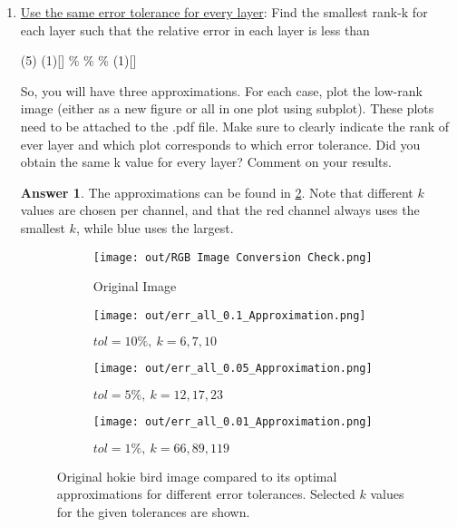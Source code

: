 \documentclass{article}
\theoremstyle{definition}
\newtheorem*{answer}{Answer}
\begin{document}
\begin{enumerate}[leftmargin=\labelsep]
\begin{enumerate}
		      \item \underline{Use the same error tolerance for every layer}: Find the smallest rank-k for each layer such that the relative error in each layer is less than

		            \begin{tasks}[label = {(\roman*)}, label-width = 1.75em, label-offset = 0em](5)
			            \task*(1)[]
			            \%
			            \%
			            \%
			            \task*(1)[]
		            \end{tasks}

		            So, you will have three approximations. For each case, plot the low-rank image (either as a new figure or all in one plot using subplot). These plots need to be attached to the .pdf file. Make sure to clearly indicate the rank of ever layer and which plot corresponds to which error tolerance. Did you obtain the same k value for every layer? Comment on your results.
		            \begin{answer}
			            The approximations can be found in \cref{fig:equal-tol}. Note that different \(k\) values are chosen per channel, and that the red channel always uses the smallest \(k\), while blue uses the largest.
			            \begin{figure}[H]
				            \centering
				            \begin{subfigure}{0.225\textwidth}
					            \centering
					            \texttt{[image: out/RGB Image Conversion Check.png]}
					            \caption{Original Image}
				            \end{subfigure}\hfill
				            \begin{subfigure}{0.225\textwidth}
					            \centering
					            \texttt{[image: out/err\_all\_0.1\_Approximation.png]}
					            \caption{\(tol = 10\%,\ k = 6, 7, 10\)}
				            \end{subfigure}\hfill
				            \begin{subfigure}{0.225\textwidth}
					            \centering
					            \texttt{[image: out/err\_all\_0.05\_Approximation.png]}
					            \caption{\(tol = 5\%,\ k = 12, 17, 23\)}
				            \end{subfigure}\hfill
				            \begin{subfigure}{0.225\textwidth}
					            \centering
					            \texttt{[image: out/err\_all\_0.01\_Approximation.png]}
					            \caption{\(tol = 1\%,\ k = 66, 89, 119\)}
					            \label{fig:1-percent-tol}
				            \end{subfigure}
				            \caption{Original hokie bird image compared to its optimal approximations for different error tolerances. Selected \(k\) values for the given tolerances are shown.}\label{fig:equal-tol}
			            \end{figure}
		            \end{answer}


\end{enumerate}
\end{enumerate}
\end{document}
